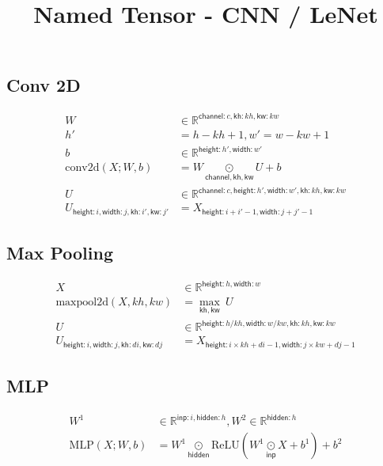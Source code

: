 \documentclass{article}
\title{Named Tensor - CNN / LeNet}
\date{}
\newcommand{\reals}[0]{\mathbb{R}}
\newcommand{\name}[1]{\mathsf{#1}}
\newcommand{\ndot}[1]{\mathbin{\mathop{\odot}\limits_{\name{#1}}}}
\newcommand{\nfun}[2]{\underset{\name{#1}}{#2}}
\begin{document}
\maketitle
\date{}

\subsection*{Conv 2D}

\begin{align*} 
W &\in \reals^{\name{channel}:c,\name{kh}:kh, \name{kw}:kw} \\
h' &= h-kh +1,  w' = w-kw +1 \\
b &\in \reals^{\name{height}: h', \name{width}:w'}  \\
\text{conv2d}(X; W, b) &=  W \ndot{channel, kh, kw} U + b \\
U &\in \reals^{{\name{channel}:c, \name{height}:h',
\name{width}:w', \name{kh}:kh, \name{kw}:kw}}  \\
U_{\name{height}:i, \name{width}:j,  \name{kh}:i', \name{kw}:j'  } &= X_{\name{height}:i+i' - 1, \name{width}:j+j' - 1}  
\end{align*}

\subsection*{Max Pooling}

\begin{align*} 
X &\in \reals^{\name{height}: h, \name{width}:w} \\
\text{maxpool2d}(X, kh, kw) &=  \nfun{kh, kw}{\max}\  U \\
U &\in \reals^{{\name{height}:h / kh,
\name{width}:w / kw, \name{kh}:kh, \name{kw}:kw}}  \\
U_{\name{height}:i, \name{width}:j, \name{kh}:di, \name{kw}:dj  } & = X_{\name{height}:i \times kh + di -1, \name{width}:j \times kw + dj -1}  
\end{align*}

\subsection*{MLP}



\begin{align*} 
W^1 &\in \reals^{\name{inp}:i, \name{hidden}:h }, 
W^2 \in \reals^{ \name{hidden}:h } \\
\text{MLP}(X; W, b) &=  W^1 \ndot{hidden} \text{ReLU}(W^1 \ndot{inp} X + b^1) + b^2 
\end{align*}
\end{document}
